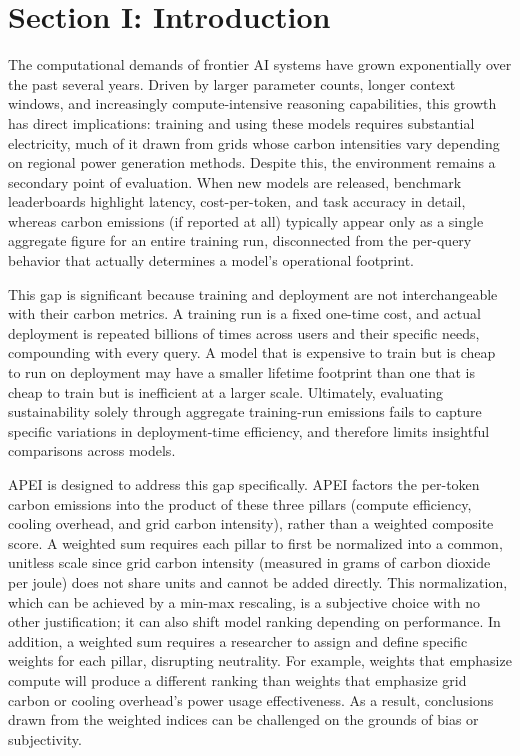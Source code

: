 \documentclass[11pt]{article}
\begin{document}
\newpage

\section*{Section I: Introduction}

The computational demands of frontier AI systems have grown exponentially over the past several years. Driven by larger parameter counts, longer context windows, and increasingly compute-intensive reasoning capabilities, this growth has direct implications: training and using these models requires substantial electricity, much of it drawn from grids whose carbon intensities vary depending on regional power generation methods. Despite this, the environment remains a secondary point of evaluation. When new models are released, benchmark leaderboards highlight latency, cost-per-token, and task accuracy in detail, whereas carbon emissions (if reported at all) typically appear only as a single aggregate figure for an entire training run, disconnected from the per-query behavior that actually determines a model's operational footprint.

This gap is significant because training and deployment are not interchangeable with their carbon metrics. A training run is a fixed one-time cost, and actual deployment is repeated billions of times across users and their specific needs, compounding with every query. A model that is expensive to train but is cheap to run on deployment may have a smaller lifetime footprint than one that is cheap to train but is inefficient at a larger scale. Ultimately, evaluating sustainability solely through aggregate training-run emissions fails to capture specific variations in deployment-time efficiency, and therefore limits insightful comparisons across models.

APEI is designed to address this gap specifically. APEI factors the per-token carbon emissions into the product of these three pillars (compute efficiency, cooling overhead, and grid carbon intensity), rather than a weighted composite score. A weighted sum requires each pillar to first be normalized into a common, unitless scale since grid carbon intensity (measured in grams of carbon dioxide per joule) does not share units and cannot be added directly. This normalization, which can be achieved by a min-max rescaling, is a subjective choice with no other justification; it can also shift model ranking depending on performance. In addition, a weighted sum requires a researcher to assign and define specific weights for each pillar, disrupting neutrality. For example, weights that emphasize compute will produce a different ranking than weights that emphasize grid carbon or cooling overhead's power usage effectiveness. As a result, conclusions drawn from the weighted indices can be challenged on the grounds of bias or subjectivity.
\end{document}
